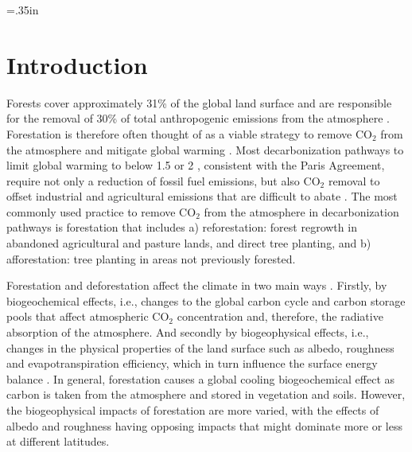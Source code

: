 \documentclass[]{article}
\begin{document}
\raggedright
\parindent=.35in %

\section{Introduction}

Forests cover approximately 31\% of the global land surface \parencite{luyssaert_land_2014,fao_global_2020} and are responsible for the removal of 30\% of total anthropogenic emissions from the atmosphere \parencite{friedlingstein_global_2022}.
Forestation is therefore often thought of as a viable strategy to remove CO$_2$ from the atmosphere and mitigate global warming \parencite{house_maximum_2002, griscom_natural_2017, smith_long-term_2022}.
Most decarbonization pathways to limit global warming to below 1.5 or 2 \textcelsius{}, consistent with the Paris Agreement, require not only a reduction of fossil fuel emissions, but also CO$_2$ removal to offset industrial and agricultural emissions that are difficult to abate \parencite{babiker_crosssectoral_2022}.
The most commonly used practice to remove CO$_2$ from the atmosphere in decarbonization pathways is forestation that includes a) reforestation: forest regrowth in abandoned agricultural and pasture lands, and direct tree planting, and b) afforestation: tree planting in areas not previously forested.

Forestation and deforestation affect the climate in two main ways \parencite{pongratz_biogeophysical_2010,ito_biogeophysical_2020,zhu_comparable_2023}.
Firstly, by biogeochemical effects, i.e., changes to the global carbon cycle and carbon storage pools that affect atmospheric CO$_2$ concentration and, therefore, the radiative absorption of the atmosphere.
And secondly by biogeophysical effects, i.e., changes in the physical properties of the land surface such as albedo, roughness and evapotranspiration efficiency, which in turn influence the surface energy balance \parencite{betts_offset_2000,bala_combined_2007,winckler_importance_2019}.
In general, forestation causes a global cooling biogeochemical effect as carbon is taken from the atmosphere and stored in vegetation and soils.
However, the biogeophysical impacts of forestation are more varied, with the effects of albedo and roughness having opposing impacts that might dominate more or less at different latitudes.
\end{document}
